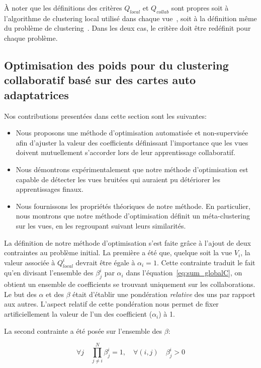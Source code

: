 \documentclass[a4paper]{article}
\begin{document}
À noter que les définitions des critères $Q_{local}$ et $Q_{collab}$ sont propres soit à l'algorithme de clustering local utilisé dans chaque vue~\cite{ghassany2012collaborative}, soit à la définition m\^{e}me du problème de clustering~\cite{sublime2018information}. Dans les deux cas, le critère doit \^{e}tre redéfinit pour chaque problème.

\subsection{Optimisation des poids pour du clustering collaboratif bas\'{e} sur des cartes auto adaptatrices}

Nos contributions presentées dans cette section sont les suivantes:
\begin{itemize}
    \item Nous proposons une méthode d'optimisation automatisée et non-supervisée afin d'ajuster la valeur des coefficients définissant l'importance que les vues doivent mutuellement s'accorder lors de leur apprentissage collaboratif.
    \item Nous démontrons expérimentalement que notre méthode d'optimisation est capable de détecter les vues bruitées qui auraient pu détériorer les apprentissages finaux.
    \item Nous fournissons les propriétés théoriques de notre méthode. En particulier, nous montrons que notre méthode d'optimisation définit un méta-clustering sur les vues, en les regroupant suivant leurs similarités.
\end{itemize}

La définition de notre méthode d'optimisation s'est faite grâce à l'ajout de deux contraintes au problème initial. La première a été que, quelque soit la vue $V_i$, la valeur associée à $Q^i_{local}$ devrait \^{e}tre égale à $\alpha_i=1$. Cette contrainte traduit le fait qu'en divisant l'ensemble des $\beta_j^i$ par $\alpha_i$ dans l'équation~\ref{eq:sum_globalC}, on obtient un ensemble de coefficients se trouvant uniquement sur les collaborations. Le but des $\alpha$ et des $\beta$ était d'établir une pondération \textit{relative} des uns par rapport aux autres. L'aspect relatif de cette pondération nous permet de fixer artificiellement la valeur de l'un des coefficient ($\alpha_i$) à 1.

La second contrainte a été posée sur l'ensemble des $\beta$:

\begin{equation}
    \forall j \quad \prod_{j \neq i}^N \beta_j^i = 1, \quad
    \forall (i,j) \quad \beta_j^i >0 
\end{equation}
\end{document}
